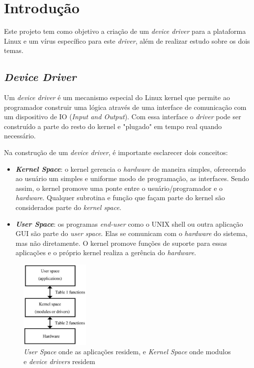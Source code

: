 \section{Introdução}

Este projeto tem como objetivo a criação de um \textit{device driver} para a
plataforma Linux e um vírus específico para este \textit{driver}, além de 
realizar estudo sobre os dois temas.

\subsection{\textit{Device Driver}}

Um \textit{device driver} é um mecanismo especial do Linux kernel que permite
ao programador construir uma lógica através de uma interface de comunicação
com um dispositivo de IO (\textit{Input and Output}). Com essa interface
o \textit{driver} pode ser construído a parte do resto do kernel e "plugado" em tempo
real quando necessário.

Na construção de um \textit{device driver}, é importante esclarecer dois conceitos:
\begin{itemize}
  \item \textit{\textbf{Kernel Space}}: o kernel gerencia o \textit{hardware} de maneira simples, oferecendo
    ao usuário um simples e uniforme modo de programação, as interfaces. Sendo assim,
    o kernel promove uma ponte entre o usuário/programador e o \textit{hardware}. Qualquer
    subrotina e função que façam parte do kernel são considerados parte do \textit{kernel space}.

  \item \textit{\textbf{User Space}}: os programas \textit{end-user} como o UNIX shell ou outra aplicação GUI são
    parte do \textit{user space}. Elas se comunicam com o \textit{hardware} do sistema, mas não diretamente.
    O kernel promove funções de suporte para essas aplicações e o próprio kernel realiza
    a gerência do \textit{hardware}.

\end{itemize}

\begin{figure}[H]
  \centering
  \includegraphics[width=0.3\textwidth]{figure/kernel.eps}
  \caption{\textit{User Space} onde as aplicações residem, e \textit{Kernel Space} onde modulos e \textit{device drivers} residem }
  \label{fig:usblinux}
\end{figure}

